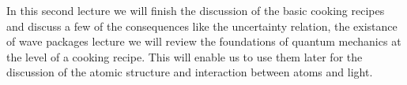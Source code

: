 In this second lecture we will finish the discussion of the basic cooking recipes and discuss a few of the consequences like the uncertainty relation, the existance of wave packages lecture we will review the foundations of quantum mechanics at the level of a cooking recipe. This will enable us to use them later for the discussion of the atomic structure and interaction between atoms and light.